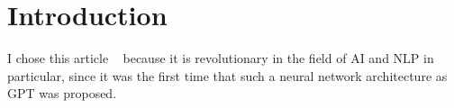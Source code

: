 \documentclass[12pt]{article}
\begin{document}
\section{Introduction}
I chose this article ~\cite{GPT} because it is revolutionary in the field of AI and NLP in particular, since it was the first time that such a neural network architecture as GPT was proposed.



\end{document}
